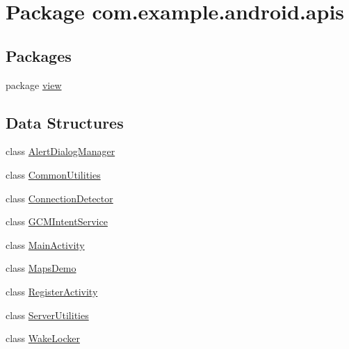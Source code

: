 \hypertarget{namespacecom_1_1example_1_1android_1_1apis}{\section{Package com.\-example.\-android.\-apis}
\label{namespacecom_1_1example_1_1android_1_1apis}
}
\subsection*{Packages}
\begin{DoxyCompactItemize}
\item 
package \hyperlink{namespacecom_1_1example_1_1android_1_1apis_1_1view}{view}
\end{DoxyCompactItemize}
\subsection*{Data Structures}
\begin{DoxyCompactItemize}
\item 
class \hyperlink{classcom_1_1example_1_1android_1_1apis_1_1_alert_dialog_manager}{Alert\-Dialog\-Manager}
\item 
class \hyperlink{classcom_1_1example_1_1android_1_1apis_1_1_common_utilities}{Common\-Utilities}
\item 
class \hyperlink{classcom_1_1example_1_1android_1_1apis_1_1_connection_detector}{Connection\-Detector}
\item 
class \hyperlink{classcom_1_1example_1_1android_1_1apis_1_1_g_c_m_intent_service}{G\-C\-M\-Intent\-Service}
\item 
class \hyperlink{classcom_1_1example_1_1android_1_1apis_1_1_main_activity}{Main\-Activity}
\item 
class \hyperlink{classcom_1_1example_1_1android_1_1apis_1_1_maps_demo}{Maps\-Demo}
\item 
class \hyperlink{classcom_1_1example_1_1android_1_1apis_1_1_register_activity}{Register\-Activity}
\item 
class \hyperlink{classcom_1_1example_1_1android_1_1apis_1_1_server_utilities}{Server\-Utilities}
\item 
class \hyperlink{classcom_1_1example_1_1android_1_1apis_1_1_wake_locker}{Wake\-Locker}
\end{DoxyCompactItemize}
